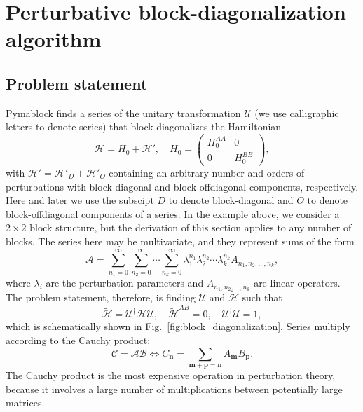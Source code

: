 \section{Perturbative block-diagonalization algorithm}

\subsection{Problem statement}

Pymablock finds a series of the unitary transformation $\mathcal{U}$ (we use calligraphic letters to denote series) that block-diagonalizes the Hamiltonian
%
\begin{equation}
\label{eq:hamiltonian}
\mathcal{H} = H_0 + \mathcal{H}',\quad H_0 = \begin{pmatrix}
H_0^{AA} & 0\\
0 & H_0^{BB}
\end{pmatrix},
\end{equation}
%
with $\mathcal{H}' = \mathcal{H}'_{D} + \mathcal{H}'_{O}$ containing an arbitrary number and orders of perturbations with block-diagonal and block-offdiagonal components, respectively.
Here and later we use the subscipt $D$ to denote block-diagonal and $O$ to denote block-offdiagonal components of a series.
In the example above, we consider a $2\times 2$ block structure, but the derivation of this section applies to any number of blocks.
The series here may be multivariate, and they represent sums of the form
%
\begin{equation}
\mathcal{A} = \sum_{n_1=0}^\infty \sum_{n_2=0}^\infty \cdots \sum_{n_k=0}^\infty \lambda_1^{n_1} \lambda_2^{n_2} \cdots \lambda_k^{n_k} A_{n_1, n_2, \ldots, n_k},
\end{equation}
%
where $\lambda_i$ are the perturbation parameters and $A_{n_1, n_2, \ldots, n_k}$ are linear operators.
%
The problem statement, therefore, is finding $\mathcal{U}$ and $\tilde{\mathcal{H}}$ such that
%
\begin{equation}
\label{eq:problem_definition}
\tilde{\mathcal{H}} = \mathcal{U}^\dagger \mathcal{H} \mathcal{U},\quad \tilde{\mathcal{H}}^{AB} = 0,\quad \mathcal{U}^\dagger \mathcal{U} = 1,
\end{equation}
%
which is schematically shown in Fig.~\ref{fig:block_diagonalization}.
Series multiply according to the Cauchy product:
%
$$
\mathcal{C} = \mathcal{A}\mathcal{B} \Leftrightarrow C_\mathbf{n} = \sum_{\mathbf{m} + \mathbf{p} = \mathbf{n}} A_\mathbf{m} B_\mathbf{p}.
$$
%
The Cauchy product is the most expensive operation in perturbation theory, because it involves a large number of multiplications between potentially large matrices.
